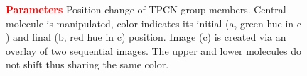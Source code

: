 \begin{figure}
	\centering
	\caption{\textcolor{red}{\textbf{Parameters}} Position change of TPCN group members. Central molecule is manipulated, color indicates its initial (a, green hue in c ) and final (b, red hue in c) position. Image (c) is created via an overlay of two sequential images. The upper and lower molecules do not shift thus sharing the same color.}
	\label{fig:TPCN-manipulation}
\end{figure}

